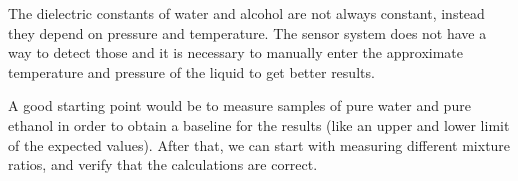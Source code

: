 
The dielectric constants of water and alcohol are not always constant, instead they depend on pressure and temperature.
The sensor system does not have a way to detect those and it is necessary to manually enter the approximate temperature and pressure of the liquid to get better results.

A good starting point would be to measure samples of pure water and pure ethanol in order to obtain a baseline for the results (like an upper and lower limit of the expected values).
After that, we can start with measuring different mixture ratios, and verify that the calculations are correct.